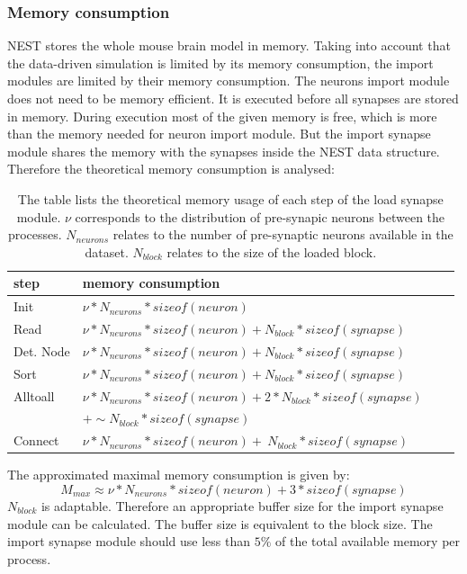 \subsubsection{Memory consumption}
NEST stores the whole mouse brain model in memory.
Taking into account that the data-driven simulation is limited by its memory consumption, the import modules are limited by their memory consumption.
The neurons import module does not need to be memory efficient.
It is executed before all synapses are stored in memory.
During execution most of the given memory is free, which is more than the memory needed for neuron import module.
But the import synapse module shares the memory with the synapses inside the NEST data structure. 
Therefore the theoretical memory consumption is analysed:
\begin{table}[ht!]
\begin{tabular}{| l | l | l | l |}
    \hline
    step & memory consumption \\ \hline \hline
    Init & $\nu * N_{neurons} * sizeof(neuron)$ \\ \hline
    Read & $\nu * N_{neurons} * sizeof(neuron) + N_{block} * sizeof(synapse)$ \\ \hline
    Det. Node & $\nu * N_{neurons} * sizeof(neuron) + N_{block} * sizeof(synapse)$ \\ \hline
    Sort & $\nu * N_{neurons} * sizeof(neuron) + N_{block} * sizeof(synapse)$ \\ \hline
    Alltoall & $\nu * N_{neurons} * sizeof(neuron) + 2 * N_{block} * sizeof(synapse)$ \\
    &$ + \sim N_{block} * sizeof(synapse)$ \\ \hline
    Connect & $\nu * N_{neurons} * sizeof(neuron) +  ~N_{block} * sizeof(synapse) $ \\ \hline 
    \end{tabular}
\caption{The table lists the theoretical memory usage of each step of the load synapse module.
$\nu$ corresponds to the distribution of pre-synapic neurons between the processes.
$N_{neurons}$ relates to the number of pre-synaptic neurons available in the dataset.
$N_{block}$ relates to the size of the loaded block.}
\end{table}
The approximated maximal memory consumption is given by:
\begin{equation}
 M_{max} \approx \nu * N_{neurons} * sizeof(neuron) + 3 * sizeof(synapse)
\end{equation}
$N_{block}$ is adaptable.
Therefore an appropriate buffer size for the import synapse module can be calculated.
The buffer size is equivalent to the block size.
The import synapse module should use less than $5\%$ of the total available memory per process.

